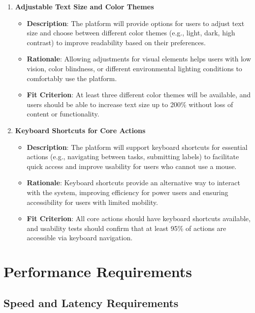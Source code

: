 \documentclass[12pt]{article}
\begin{document}
\begin{enumerate}
    \item \textbf{Adjustable Text Size and Color Themes}  
        \begin{itemize} 
            \item \textbf{Description}: The platform will provide options for users to adjust text size and choose between different color themes (e.g., light, dark, high contrast) to improve readability based on their preferences.  
            \item \textbf{Rationale}: Allowing adjustments for visual elements helps users with low vision, color blindness, or different environmental lighting conditions to comfortably use the platform.  
            \item \textbf{Fit Criterion}: At least three different color themes will be available, and users should be able to increase text size up to 200\% without loss of content or functionality.
        \end{itemize}
    \item \textbf{Keyboard Shortcuts for Core Actions}  
        \begin{itemize} 
            \item \textbf{Description}: The platform will support keyboard shortcuts for essential actions (e.g., navigating between tasks, submitting labels) to facilitate quick access and improve usability for users who cannot use a mouse.  
            \item \textbf{Rationale}: Keyboard shortcuts provide an alternative way to interact with the system, improving efficiency for power users and ensuring accessibility for users with limited mobility.  
            \item \textbf{Fit Criterion}: All core actions should have keyboard shortcuts available, and usability tests should confirm that at least 95\% of actions are accessible via keyboard navigation.
        \end{itemize}
\end{enumerate}


\section{Performance Requirements}
\subsection{Speed and Latency Requirements}
\end{document}
